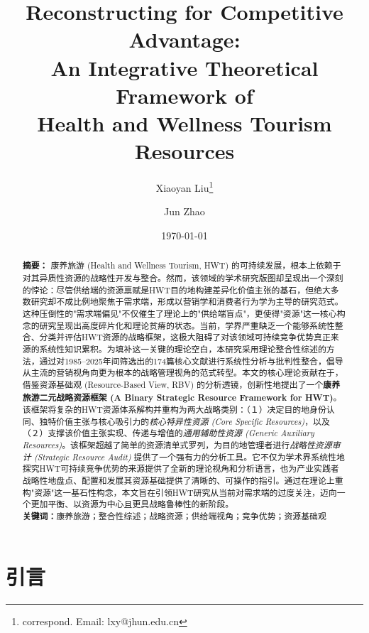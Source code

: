 \documentclass[UTF8, 12pt, a4paper, twoside]{ctexart}
\title{%
    \textbf{Reconstructing for Competitive Advantage: \\
    An Integrative Theoretical Framework of \\
    Health and Wellness Tourism Resources}%
}
\author{%
    Xiaoyan Liu\thanks{correspond. Email: lxy@jhun.edu.cn} \and 
    Jun Zhao%
}
\date{\today}
\begin{document}
\maketitle
\thispagestyle{empty}

\begin{abstract}
	\noindent \textbf{摘要：}
	康养旅游 (Health and Wellness Tourism, HWT) 的可持续发展，根本上依赖于对其异质性资源的战略性开发与整合。然而，该领域的学术研究版图却呈现出一个深刻的悖论：尽管供给端的资源禀赋是HWT目的地构建差异化价值主张的基石，但绝大多数研究却不成比例地聚焦于需求端，形成以营销学和消费者行为学为主导的研究范式。这种压倒性的"需求端偏见"不仅催生了理论上的"供给端盲点"，更使得"资源"这一核心构念的研究呈现出高度碎片化和理论贫瘠的状态。当前，学界严重缺乏一个能够系统性整合、分类并评估HWT资源的战略框架，这极大阻碍了对该领域可持续竞争优势真正来源的系统性知识累积。为填补这一关键的理论空白，本研究采用理论整合性综述的方法，通过对1985--2025年间筛选出的174篇核心文献进行系统性分析与批判性整合，倡导从主流的营销视角向更为根本的战略管理视角的范式转型。本文的核心理论贡献在于，借鉴资源基础观 (Resource-Based View, RBV) 的分析透镜，创新性地提出了一个\textbf{康养旅游二元战略资源框架 (A Binary Strategic Resource Framework for HWT)}。该框架将复杂的HWT资源体系解构并重构为两大战略类别：（１）决定目的地身份认同、独特价值主张与核心吸引力的\textit{核心特异性资源 (Core Specific Resources)}，以及（２）支撑该价值主张实现、传递与增值的\textit{通用辅助性资源 (Generic Auxiliary Resources)}。该框架超越了简单的资源清单式罗列，为目的地管理者进行\textit{战略性资源审计 (Strategic Resource Audit)} 提供了一个强有力的分析工具。它不仅为学术界系统性地探究HWT可持续竞争优势的来源提供了全新的理论视角和分析语言，也为产业实践者战略性地盘点、配置和发展其资源基础提供了清晰的、可操作的指引。通过在理论上重构"资源"这一基石性构念，本文旨在引领HWT研究从当前对需求端的过度关注，迈向一个更加平衡、以资源为中心且更具战略鲁棒性的新阶段。 \\
	\noindent \textbf{关键词：}康养旅游；整合性综述；战略资源；供给端视角；竞争优势；资源基础观
\end{abstract}

\newpage
\listoftodos

\newpage
\tableofcontents
\newpage

\section{引言}
\end{document}
